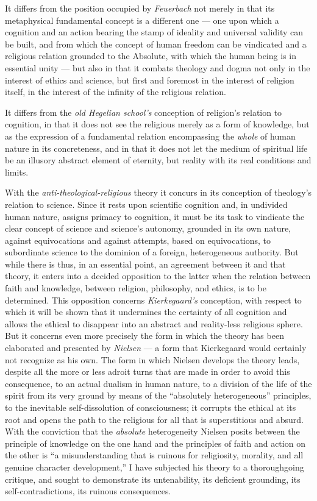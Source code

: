\documentclass[12pt,a4paper]{book}
\begin{document}
It differs from the position occupied by \emph{Feuerbach} not merely in that
its metaphysical fundamental concept is a different one --- one upon
which a cognition and an action bearing the stamp of ideality and
universal validity can be built, and from which the concept of human
freedom can be vindicated and a religious relation grounded to the
Absolute, with which the human being is in essential unity --- but
also in that it combats theology and dogma not only in the interest of
ethics and science, but first and foremost in the interest of religion
itself, in the interest of the infinity of the religious relation.

It differs from the \emph{old Hegelian school's} conception of religion's
relation to cognition, in that it does not see the religious merely as
a form of knowledge, but as the expression of a fundamental relation
encompassing the \emph{whole} of human nature in its concreteness, and in
that it does not let the medium of spiritual life be an illusory
abstract element of eternity, but reality with its real conditions and
limits.

With the \emph{anti-theological-religious} theory it concurs in its
conception of theology's relation to science. Since it rests upon
scientific cognition and, in undivided human nature, assigns primacy
to cognition, it must be its task to vindicate the clear concept of
science and science's autonomy, grounded in its own nature, against
equivocations and against attempts, based on equivocations, to
subordinate science to the dominion of a foreign, heterogeneous
authority. But while there is thus, in an essential point, an
agreement between it and that theory, it enters into a decided
opposition to the latter when the relation between faith and
knowledge, between religion, philosophy, and ethics, is to be
determined. This opposition concerns \emph{Kierkegaard's} conception, with
respect to which it will be shown that it undermines the certainty of
all cognition and allows the ethical to disappear into an abstract and
reality-less religious sphere. But it concerns even more precisely the
form in which the theory has been elaborated and presented by \emph{Nielsen}
--- a form that Kierkegaard would certainly not recognize as his own.
The form in which Nielsen develops the theory leads, despite all the
more or less adroit turns that are made in order to avoid this
consequence, to an actual dualism in human nature, to a division of
the life of the spirit from its very ground by means of the ``absolutely
heterogeneous'' principles, to the inevitable self-dissolution of
consciousness; it corrupts the ethical at its root and opens the path
to the religious for all that is superstitious and absurd. With the
conviction that the \emph{absolute} heterogeneity Nielsen posits between the
principle of knowledge on the one hand and the principles of faith and
action on the other is ``a misunderstanding that is ruinous for
religiosity, morality, and all genuine character development,'' I have
subjected his theory to a thoroughgoing critique, and sought to
demonstrate its untenability, its deficient grounding, its
self-contradictions, its ruinous consequences.
\end{document}
